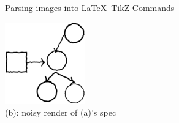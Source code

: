 \documentclass[aspectratio=169,final]{beamer}
\begin{document}
\begin{frame}{Parsing images into \LaTeX~TikZ Commands}
{\begin{minipage}[t]{\noisySize}
        \centering\includegraphics[width = \textwidth]{figures/60-1-reduced.png}\\
                                  {\small     (b): noisy render of (a)'s spec}
      \end{minipage}}%
    \hspace{0.2\textwidth}%
\end{frame}
\end{document}
